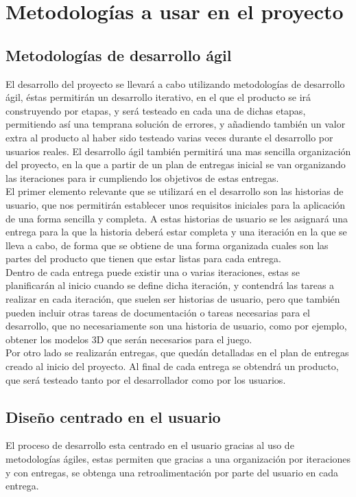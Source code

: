 \chapter{Metodologías a usar en el proyecto}
\label{ch:metodologias}

\section{Metodologías de desarrollo ágil}
El desarrollo del proyecto se llevará a cabo utilizando metodologías de desarrollo ágil, éstas permitirán un desarrollo iterativo, en el que el producto se irá construyendo por etapas, y será testeado en cada una de dichas etapas, permitiendo así una temprana solución de errores, y añadiendo también un valor extra al producto al haber sido testeado varias veces durante el desarrollo por usuarios reales. El desarrollo ágil también permitirá una mas sencilla organización del proyecto, en la que a partir de un plan de entregas inicial se van organizando las iteraciones para ir cumpliendo los objetivos de estas entregas.\\

El primer elemento relevante que se utilizará en el desarrollo son las historias de usuario, que nos permitirán establecer unos requisitos iniciales para la aplicación de una forma sencilla y completa. A estas historias de usuario se les asignará una entrega para la que la historia deberá estar completa y una iteración en la que se lleva a cabo, de forma que se obtiene de una forma organizada cuales son las partes del producto que tienen que estar listas para cada entrega.\\

Dentro de cada entrega puede existir una o varias iteraciones, estas se planificarán al inicio cuando se define dicha iteración, y contendrá las tareas a realizar en cada iteración, que suelen ser historias de usuario, pero que también pueden incluir otras tareas de documentación o tareas necesarias para el desarrollo, que no necesariamente son una historia de usuario, como por ejemplo, obtener los modelos 3D que serán necesarios para el juego.\\

Por otro lado se realizarán entregas, que quedán detalladas en el plan de entregas creado al inicio del proyecto. Al final de cada entrega se obtendrá un producto, que será testeado tanto por el desarrollador como por los usuarios.

\section{Diseño centrado en el usuario}
El proceso de desarrollo esta centrado en el usuario gracias al uso de metodologías ágiles, estas permiten que gracias a una organización por iteraciones y con entregas, se obtenga una retroalimentación por parte del usuario en cada entrega.\\

